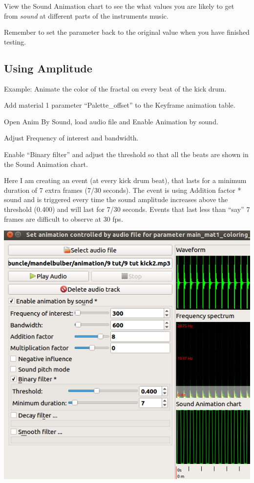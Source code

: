 View the Sound Animation chart to see the what values you are likely to
get from \emph{sound} at different parts of the instruments music.

Remember to set the parameter back to the original value when you have
finished testing.

\subsection{Using Amplitude}\label{using-amplitude}

Example: Animate the color of the fractal on every beat of the kick
drum.

Add material 1 parameter ``Palette\_offset'' to the Keyframe animation
table.

Open Anim By Sound, load audio file and Enable Animation by sound.

Adjust Frequency of interest and bandwidth.

Enable ``Binary filter'' and adjust the threshold so that all the beats
are shown in the Sound Animation chart.

Here I am creating an event (at every kick drum beat), that lasts for a
minimum duration of 7 extra frames (7/30 seconds). The event is using
Addition factor * sound and is triggered every time the sound amplitude
increases above the threshold (0.400) and will last for 7/30 seconds.
Events that last less than ``say'' 7 frames are difficult to observe at
30 fps.

\includegraphics[width=5.24528in,height=5.29016in]{img/sound/media/image8.png}

